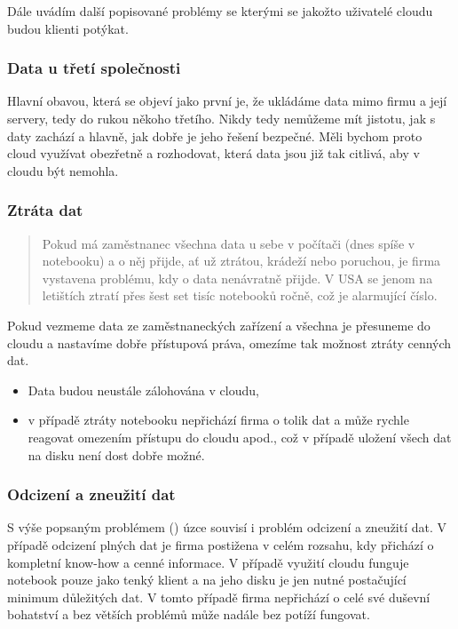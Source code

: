 Dále uvádím další popisované problémy se kterými se jakožto uživatelé cloudu budou klienti potýkat.

\subsubsection{Data u třetí společnosti}
Hlavní obavou, která se objeví jako první je, že ukládáme data mimo firmu a její servery, tedy do rukou někoho třetího. Nikdy tedy nemůžeme mít jistotu, jak s daty zachází a hlavně, jak dobře je jeho řešení bezpečné. Měli bychom proto cloud využívat obezřetně a rozhodovat, která data jsou již tak citlivá, aby v cloudu být nemohla.

\subsubsection{Ztráta dat}
\label{sec:ZtrataDat}
\begin{quote}
Pokud má zaměstnanec všechna data u sebe v počítači (dnes spíše v notebooku) a o něj přijde, ať už ztrátou, krádeží nebo poruchou, je firma vystavena problému, kdy o data nenávratně přijde. V USA se jenom na letištích ztratí přes šest set tisíc notebooků ročně, což je alarmující číslo.\cite{notebook:ztraceneNBnaLetistich}
\end{quote}

Pokud vezmeme data ze zaměstnaneckých zařízení a všechna je přesuneme do cloudu a nastavíme dobře přístupová práva, omezíme tak možnost ztráty cenných dat.
\begin{itemize}
	\item Data budou neustále zálohována v cloudu,
	\item v případě ztráty notebooku nepřichází firma o tolik dat a může rychle reagovat omezením přístupu do cloudu apod., což v případě uložení všech dat na disku není dost dobře možné.
\end{itemize}

\subsubsection{Odcizení a zneužití dat}
S výše popsaným problémem () úzce souvisí i problém odcizení a zneužití dat. V případě odcizení plných dat je firma postižena v celém rozsahu, kdy přichází o kompletní know-how a cenné informace. V případě využití cloudu funguje notebook pouze jako tenký klient a na jeho disku je jen nutné postačující minimum důležitých dat. V tomto případě firma nepřichází o celé své duševní bohatství a bez větších problémů může nadále bez potíží fungovat.

